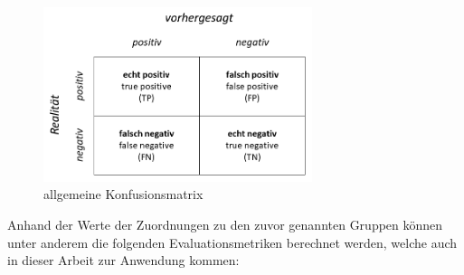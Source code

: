 \begin{figure}[H]
    \centering
    \includegraphics[width=0.7\textwidth]{images/Confusion}
    \caption{allgemeine Konfusionsmatrix\label{fig:confu}}
\end{figure}

Anhand der Werte der Zuordnungen zu den zuvor genannten Gruppen können unter anderem die folgenden Evaluationsmetriken berechnet werden, welche auch in dieser Arbeit zur Anwendung kommen:

